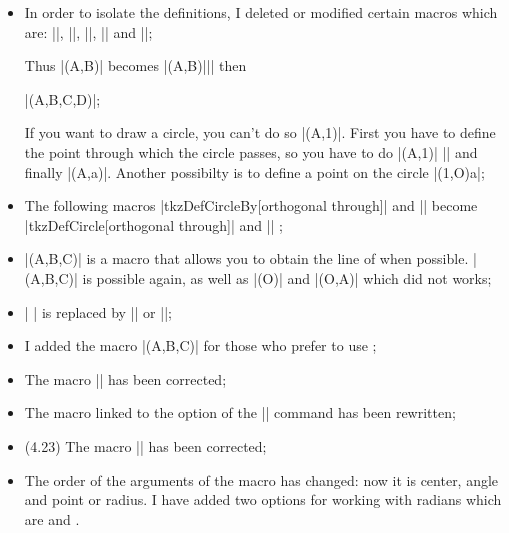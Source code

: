 \begin{itemize}
\item  In order to isolate the definitions, I deleted or modified certain macros which are: |\tkzDrawLine|, |\tkzDrawTriangle|, |\tkzDrawCircle|, |\tkzDrawSemiCircle| and  |\tkzDrawRectangle|;

Thus |\tkzDrawSquare(A,B)| becomes |\tkzDefSquare(A,B)||| then

 |\tkzDrawPolygon(A,B,C,D)|;

If you want to draw a circle, you can't do so |\tkzDrawCircle[R](A,1)|. First you have to define the point through which the circle passes, so you have to do 
|\tkzDefCircle[R](A,1)| || and finally |\tkzDrawCircle(A,a)|. Another possibilty is to define a point on the circle |\tkzDefShiftPoint[A](1,O){a}|;


\item The following macros  |tkzDefCircleBy[orthogonal through]| and || become |tkzDefCircle[orthogonal through]| and || ;


\item |\tkzDefLine[euler](A,B,C)| is a macro that allows you to obtain the line of  when possible. |\tkzDefLine[altitude](A,B,C)| is possible again, as well as |\tkzDefLine[tangent at=A](O)| and |\tkzDefLine[tangent from=P](O,A)| which did not works;


\item | \tkzDefTangent| is replaced by |\tkzDefLine[tangent from = ...]| or |\tkzDefLine[tangent at = ...]|;


\item I added the macro |(A,B,C)| for those who prefer to use  \TIKZ ;


\item The macro |\tkzMarkAngle| has been corrected;

\item The macro linked to the  option of the |\tkzDefCircle| command has been rewritten;

\item (4.23) The macro |\tkzDrawSemiCircle| has been corrected;

\item 
The order of the arguments of the macro  has changed: now it is center, angle and point or radius.
I have added two options for working with radians which are  and .



\end{itemize}
